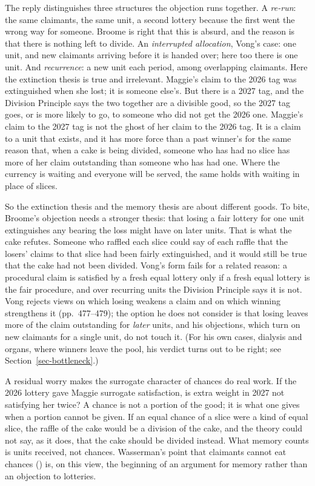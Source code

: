 \documentclass[
  11pt,
  letterpaper,
  DIV=11,
  numbers=noendperiod,
  twoside]{scrartcl}
\begin{document}
The reply distinguishes three structures the objection runs together. A
\emph{re-run}: the same claimants, the same unit, a second lottery
because the first went the wrong way for someone. Broome is right that
this is absurd, and the reason is that there is nothing left to divide.
An \emph{interrupted allocation}, Vong's case: one unit, and new
claimants arriving before it is handed over; here too there is one unit.
And \emph{recurrence}: a new unit each period, among overlapping
claimants. Here the extinction thesis is true and irrelevant. Maggie's
claim to the 2026 tag was extinguished when she lost; it is someone
else's. But there is a 2027 tag, and the Division Principle says the two
together are a divisible good, so the 2027 tag goes, or is more likely
to go, to someone who did not get the 2026 one. Maggie's claim to the
2027 tag is not the ghost of her claim to the 2026 tag. It is a claim to
a unit that exists, and it has more force than a past winner's for the
same reason that, when a cake is being divided, someone who has had no
slice has more of her claim outstanding than someone who has had one.
Where the currency is waiting and everyone will be served, the same
holds with waiting in place of slices.

So the extinction thesis and the memory thesis are about different
goods. To bite, Broome's objection needs a stronger thesis: that losing
a fair lottery for one unit extinguishes any bearing the loss might have
on later units. That is what the cake refutes. Someone who raffled each
slice could say of each raffle that the losers' claims to that slice had
been fairly extinguished, and it would still be true that the cake had
not been divided. Vong's form fails for a related reason: a procedural
claim is satisfied by a fresh equal lottery only if a fresh equal
lottery is the fair procedure, and over recurring units the Division
Principle says it is not. Vong rejects views on which losing weakens a
claim and on which winning strengthens it (pp.~477--479); the option he
does not consider is that losing leaves more of the claim outstanding
for \emph{later} units, and his objections, which turn on new claimants
for a single unit, do not touch it. (For his own cases, dialysis and
organs, where winners leave the pool, his verdict turns out to be right;
see Section~\ref{sec-bottleneck}.)

A residual worry makes the surrogate character of chances do real work.
If the 2026 lottery gave Maggie surrogate satisfaction, is extra weight
in 2027 not satisfying her twice? A chance is not a portion of the good;
it is what one gives when a portion cannot be given. If an equal chance
of a slice were a kind of equal slice, the raffle of the cake would be a
division of the cake, and the theory could not say, as it does, that the
cake should be divided instead. What memory counts is units received,
not chances. Wasserman's point that claimants cannot eat chances
() is, on this view, the beginning of
an argument for memory rather than an objection to lotteries.
\end{document}
